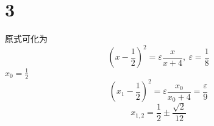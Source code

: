 \documentclass[12pt]{article}
\begin{document}
\section{3}

原式可化为
\begin{equation}
	\left(x-\frac{1}{2}\right)^2 = \varepsilon \frac{x}{x+4},\ \varepsilon = \frac{1}{8}
\end{equation}
$x_0 = \frac{1}{2}$
\begin{equation}
	\left(x_1-\frac{1}{2}\right)^2 = \varepsilon \frac{x_0}{x_0+4}  = \frac{\varepsilon}{9}
\end{equation}
\begin{equation}
	x_{1,2} = \frac{1}{2} \pm \frac{\sqrt{2}}{12}
\end{equation}







\nocite{*}


\end{document}
